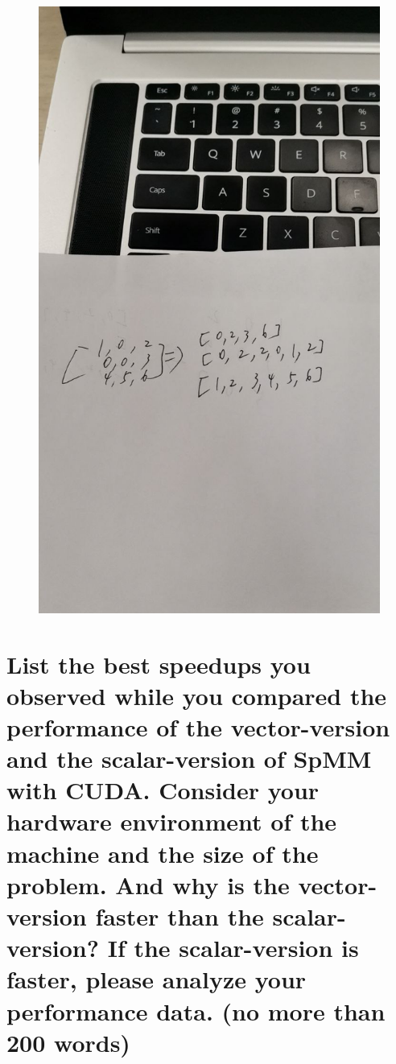 \documentclass{article}
\begin{document}
\begin{figure}[ht!]
\centering
\includegraphics[width=5in]{example}
\end{figure}

\section{List the best speedups you observed while you compared the performance of the vector-version and the scalar-version of SpMM with CUDA. Consider your hardware environment of the machine and the size of the problem. And why is the vector-version faster than the scalar-version? If the scalar-version is faster, please analyze your performance data. (no more than 200 words)}
\end{document}
